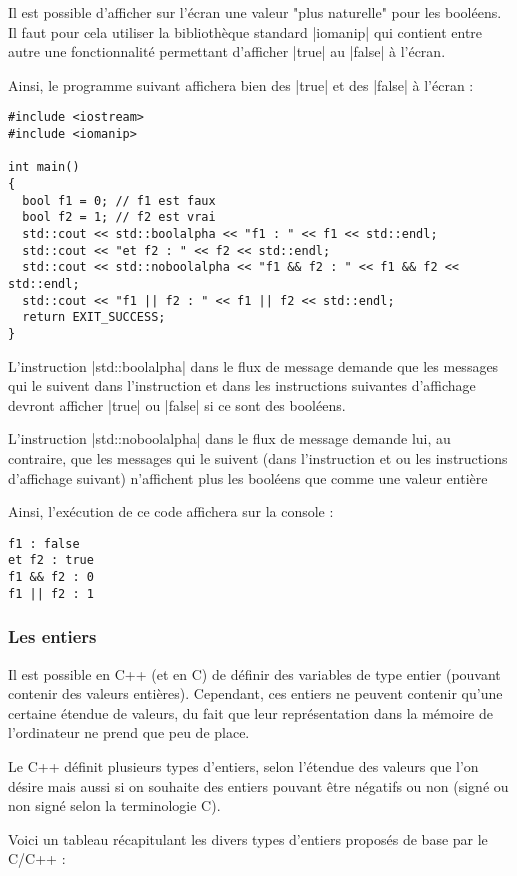 Il est possible d'afficher sur l'écran une valeur "plus naturelle" pour les booléens. Il faut pour cela utiliser la bibliothèque standard |iomanip| qui contient entre autre une fonctionnalité permettant d'afficher |true| au |false| à l'écran.

Ainsi, le programme suivant affichera bien des |true| et des |false| à l'écran :
\begin{lstlisting}[caption=Exemple d'utilisation de std::boolalpha]
#include <iostream>
#include <iomanip>

int main()
{
  bool f1 = 0; // f1 est faux
  bool f2 = 1; // f2 est vrai
  std::cout << std::boolalpha << "f1 : " << f1 << std::endl;
  std::cout << "et f2 : " << f2 << std::endl;
  std::cout << std::noboolalpha << "f1 && f2 : " << f1 && f2 << std::endl;
  std::cout << "f1 || f2 : " << f1 || f2 << std::endl;
  return EXIT_SUCCESS;
}
\end{lstlisting}

L'instruction |std::boolalpha| dans le flux de message demande que les messages qui le suivent dans l'instruction et dans les instructions suivantes d'affichage devront afficher |true| ou |false| si ce sont des booléens.

L'instruction |std::noboolalpha| dans le flux de message demande lui, au contraire, que les messages qui le suivent (dans l'instruction et ou les instructions d'affichage suivant) n'affichent plus les booléens que comme une valeur entière

Ainsi, l'exécution de ce code affichera sur la console :
\begin{verbatim}
f1 : false
et f2 : true
f1 && f2 : 0
f1 || f2 : 1
\end{verbatim}

\subsubsection{Les entiers}

Il est possible en C++ (et en C) de définir des variables de type entier (pouvant contenir des valeurs entières).
Cependant, ces entiers ne peuvent contenir qu'une certaine étendue de valeurs, du fait que leur représentation dans la mémoire de l'ordinateur ne prend que peu de place.

Le C++ définit plusieurs types d'entiers, selon l'étendue des valeurs que l'on désire mais aussi si on souhaite des entiers pouvant être négatifs ou non (signé ou non signé selon la terminologie C).

Voici un tableau récapitulant les divers types d'entiers proposés de base par le C/C++ :

